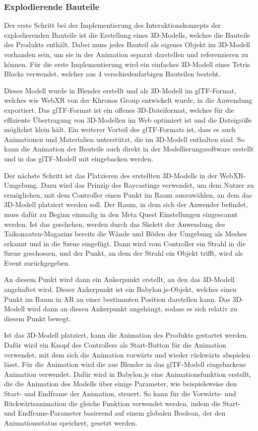 \subsubsection{Explodierende Bauteile}

Der erste Schritt bei der Implementierung des Interaktionskonzepts der \glqq{}explodierenden\grqq{} Bauteile ist die Erstellung eines 3D-Modells, welches die Bauteile des Produkts enthält.
Dabei muss jedes Bauteil als eigenes Objekt im 3D-Modell vorhanden sein, um sie in der Animation separat darstellen und referenzieren zu können.
Für die erste Implementierung wird ein einfaches 3D-Modell eines Tetris Blocks verwendet, welcher aus 4 verschiedenfarbigen Bauteilen besteht.

Dieses Modell wurde in Blender erstellt und als 3D-Modell im glTF-Format, welches wie WebXR von der Khronos Group entwickelt wurde, in die Anwendung exportiert.
Das glTF-Format ist ein offenes 3D-Dateiformat, welches für die effiziente Übertragung von 3D-Modellen im Web optimiert ist und die Dateigröße möglichst klein hält.
Ein weiterer Vorteil des glTF-Formats ist, dass es auch Animationen und Materialien unterstützt, die im 3D-Modell enthalten sind.
So kann die Animation der Bauteile auch direkt in der Modellierungssoftware erstellt und in das glTF-Modell mit eingebacken werden.

Der nächste Schritt ist das Platzieren des erstellten 3D-Modells in der WebXR-Umgebung.
Dazu wird das Prinzip des Raycastings verwendet, um dem Nutzer zu ermöglichen, mit dem Controller einen Punkt im Raum auszuwählen, an dem das 3D-Modell platziert werden soll.
Der Raum, in dem sich der Anwender befindet, muss dafür zu Beginn einmalig in den Meta Quest Einstellungen eingescannt werden.
Ist das geschehen, werden durch das Skelett der Anwendung des Taikonauten-Magazins bereits die Wände und Böden der Umgebung als Meshes erkannt und in die Szene eingefügt.
Dann wird vom Controller ein Strahl in die Szene geschossen, und der Punkt, an dem der Strahl ein Objekt trifft, wird als Event zurückgegeben.

An diesem Punkt wird dann ein Ankerpunkt erstellt, an den das 3D-Modell angehaftet wird.
Dieser Ankerpunkt ist ein Babylon.js-Objekt, welches einen Punkt im Raum in AR an einer bestimmten Position darstellen kann.
Das 3D-Modell wird dann an diesen Ankerpunkt angehängt, sodass es sich relativ zu diesem Punkt bewegt.


Ist das 3D-Modell platziert, kann die Animation des Produkts gestartet werden.
Dafür wird ein Knopf des Controllers als Start-Button für die Animation verwendet, mit dem sich die Animation vorwärts und wieder rückwärts abspielen lässt.
Für die Animation wird die aus Blender in das glTF-Modell eingebackene Animation verwendet.
Dafür wird in Babylon.js eine Animationsfunktion erstellt, die die Animation des Modells über einige Parameter, wie beispielsweise den Start- und Endframe der Animation, steuert.
So kann für die Vorwärts- und Rückwärtsanimation die gleiche Funktion verwendet werden, indem die Start- und Endframe-Parameter basierend auf einem globalen Boolean, der den Animationsstatus speichert, gesetzt werden.


